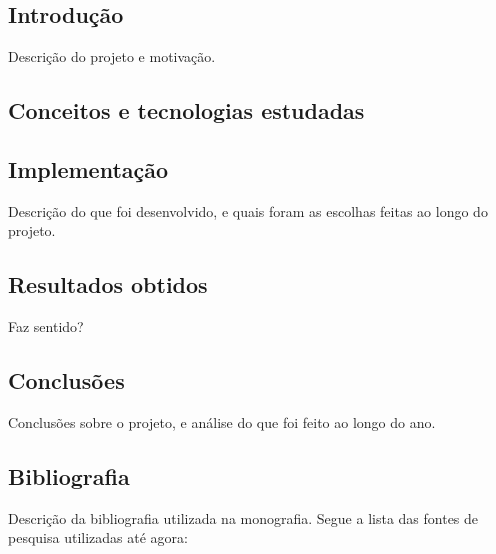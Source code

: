 \documentclass[titlepage]{article}
\begin{document}
\subsection{Introdução}
Descrição do projeto e motivação.

\subsection{Conceitos e tecnologias estudadas}

\subsection{Implementação}
Descrição do que foi desenvolvido, e quais foram as escolhas feitas ao longo do projeto.

\subsection{Resultados obtidos}
Faz sentido?

\subsection{Conclusões}
Conclusões sobre o projeto, e análise do que foi feito ao longo do ano.

\subsection{Bibliografia}
Descrição da bibliografia utilizada na monografia. Segue a lista das fontes de pesquisa utilizadas até agora:
\end{document}
